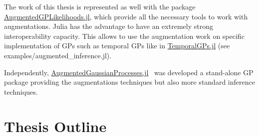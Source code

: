 The work of this thesis is represented as well with the package \href{https://github.com/JuliaGaussianProcesses/AugmentedGPLikelihoods.jl}{AugmentedGPLikelihoods.jl}, which provide all the necessary tools to work with augmentations.
Julia has the advantage to have an extremely strong interoperability capacity.
This allows to use the augmentation work on specific implementation of \ac{GPs} such as temporal \ac{GPs} like in \href{https://github.com/JuliaGaussianProcesses/TemporalGPs.jl}{TemporalGPs.jl} (see examples/augmented\_inference.jl).

Independently, \href{https://github.com/theogf/AugmentedGaussianProcesses.jl}{AugmentedGaussianProcesses.jl}~\cite{theo_galy_fajou_2021_5728215} was developed a stand-alone \ac{GP} package providing the augmentations techniques but also more standard inference techniques. 

\section{Thesis Outline}

